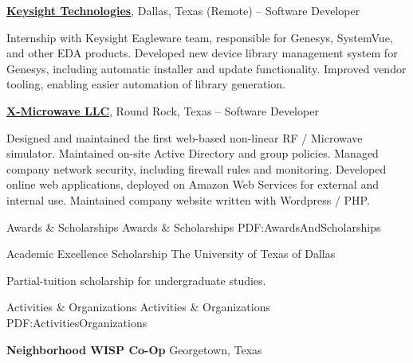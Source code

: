 \documentclass[letterpaper,MMMyyyy,nonstopmode]{simpleresumecv}
\begin{document}
\begin{Body}
\BigGap
\Entry
\href{https://keysight.com/}{\textbf{Keysight Technologies}},
Dallas, Texas (Remote)
\hfill
{} -- 
\Gap
Software Developer
\begin{Detail}
\BulletItem
Internship with Keysight Eagleware team, responsible for
Genesys, SystemVue, and other EDA products.
\BulletItem
Developed new device library management system for Genesys, including
automatic installer and update functionality.
\BulletItem
Improved vendor tooling, enabling easier automation of library generation.
\end{Detail}

\BigGap
\Entry
\href{https://www.xmicrowave.com/}{\textbf{X-Microwave LLC}},
Round Rock, Texas
\hfill
{} -- 
\Gap
Software Developer
\begin{Detail}
\BulletItem
Designed and maintained the first web-based non-linear RF / Microwave simulator.
\BulletItem
Maintained on-site Active Directory and group policies.
\BulletItem
Managed company network security, including firewall rules and monitoring.
\BulletItem
Developed online web applications, deployed on Amazon Web Services for external
and internal use.
\BulletItem
Maintained company website written with Wordpress / PHP.
\end{Detail}




\Section
{Awards \&\newline
Scholarships}
{Awards \& Scholarships}
{PDF:AwardsAndScholarships}

\Gap
\BulletItem
Academic Excellence Scholarship
\hfill
{}
\newline
The University of Texas of Dallas
\begin{Detail}
\Item
Partial-tuition scholarship for undergraduate studies.
\end{Detail}



\Section
{Activities \& Organizations}
{Activities \& Organizations}
{PDF:ActivitiesOrganizations}

\Entry
\textbf{Neighborhood WISP Co-Op}
\newline
Georgetown, Texas


\end{Body}
\end{document}
